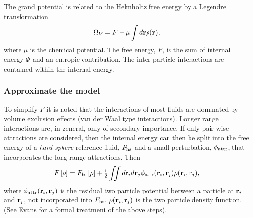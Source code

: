 The grand potential is related to the Helmholtz free energy by a Legendre transformation
\begin{align}
  \Omega_V = F -  \mu \int d\textbf{r} \rho(\textbf{r}), \label{eqn:OmegaVDefn}
\end{align}
where $\mu$ is the chemical potential.
The free energy, $F$, is the sum of  internal energy $\Phi$ and an  entropic contribution.
The inter-particle interactions are contained within the internal energy.

\subsubsection{Approximate the model}\label{sec:nuc:DFT:approx}
To simplify $F$ it is noted that  the interactions of most fluids are dominated  by volume exclusion effects (van der Waal type interactions).
Longer range interactions are, in general, only of secondary importance\cite{Oxtoby1992}.
If only pair-wise attractions are considered, then the internal energy can then be split into the 
free energy of a {\em hard sphere} reference fluid, $F_{\text{hs}}$ 
and a small perturbation, $\phi_{\text{attr}}$, that incorporates the long range attractions.
Then 
\begin{align}
   F\left[ \rho \right] = F_{\text{hs}}\left[ \rho \right] +\tfrac{1}{2}   \iint d \textbf{r}_i d\textbf{r}_j \phi_{\text{attr}}( \textbf{r}_i, \textbf{r}_j)\rho(\textbf{r}_i, \textbf{r}_j),  \label{eqn:F_pert}
\end{align}
where $\phi_{\text{attr}}(\textbf{r}_i, \textbf{r}_j)$ is the residual two particle potential between a particle at $\textbf{r}_i$ and $\textbf{r}_j$,
not incorporated into $F_{\text{hs}}$.
$\rho(\textbf{r}_i, \textbf{r}_j) $ is the two particle density function.
(See Evans\cite{Evans1992} for a formal treatment of the above steps).


